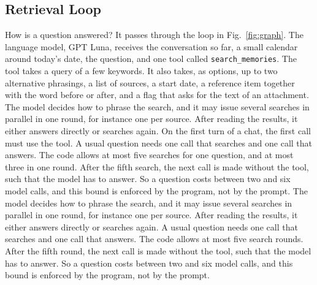 \documentclass[conference]{IEEEtran}
\newcommand{\llmname}{GPT\nobreakdash-6 Luna}
\begin{document}
\subsection{Retrieval Loop}
How is a question answered? It passes through the loop in Fig.~\ref{fig:graph}. The language model, \llmname{}, receives the conversation so far, a small calendar around today's date, the question, and one tool called \texttt{search\_memories}. The tool takes a query of a few keywords. It also takes, as options, up to two alternative phrasings, a list of sources, a start date, a reference item together with the word before or after, and a flag that asks for the text of an attachment. The model decides how to phrase the search, and it may issue several searches in parallel in one round, for instance one per source. After reading the results, it either answers directly or searches again. On the first turn of a chat, the first call must use the tool. A usual question needs one call that searches and one call that answers. The code allows at most five searches for one question, and at most three in one round. After the fifth search, the next call is made without the tool, such that the model has to answer. So a question costs between two and six model calls, and this bound is enforced by the program, not by the prompt.
The model decides how to phrase the search, and it may issue several searches in parallel in one round, for instance one per source. After reading the results, it either answers directly or searches again. A usual question needs one call that searches and one call that answers. The code allows at most five search rounds. After the fifth round, the next call is made without the tool, such that the model has to answer. So a question costs between two and six model calls, and this bound is enforced by the program, not by the prompt.
\end{document}
